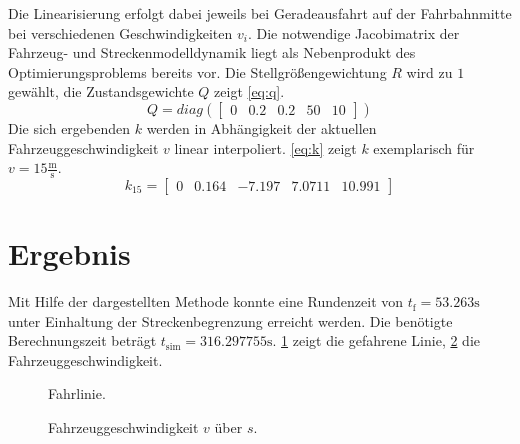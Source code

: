 \documentclass[pdf]{ifacconf}
\begin{document}
\begin{enumerate}
\begin{equation}
	\end{equation}		
	Die Linearisierung erfolgt dabei jeweils bei Geradeausfahrt auf der Fahrbahnmitte bei verschiedenen Geschwindigkeiten $v_i$. Die notwendige Jacobimatrix der Fahrzeug- und Streckenmodelldynamik liegt als Nebenprodukt des Optimierungsproblems bereits vor. Die Stellgrößengewichtung $R$ wird zu $1$ gewählt, die Zustandsgewichte $Q$ zeigt \ref{eq:q}.
	\begin{equation}
		Q = diag(\begin{bmatrix}
		0 & 0.2 & 0.2 & 50 & 10
		\end{bmatrix})
		\label{eq:q}
	\end{equation}	 
	Die sich ergebenden $k$ werden in Abhängigkeit der aktuellen Fahrzeuggeschwindigkeit $v$ linear interpoliert. \ref{eq:k} zeigt $k$ exemplarisch für $v = 15 \frac{\text{m}}{\text{s}}$.
	\begin{equation}
		k_{15} = \begin{bmatrix}
		0 & 0.164 & -7.197 & 7.0711 & 10.991	
		\end{bmatrix}
		\label{eq:k}
	\end{equation}	 
\end{enumerate}

\section{Ergebnis}
Mit Hilfe der dargestellten Methode konnte eine Rundenzeit von $t_{\text{f}}=53.263 \text{s}$ unter Einhaltung der Streckenbegrenzung erreicht werden. Die benötigte Berechnungszeit beträgt $t_{\text{sim}}=316.297755 \text{s}$. \ref{fig2} zeigt die gefahrene Linie, \ref{fig3} die Fahrzeuggeschwindigkeit. 
\begin{figure}[h]
	\begin{center}
		\scalebox{0.8}{} %
		\caption{Fahrlinie.}
		\label{fig2}
	\end{center}
\end{figure}

\begin{figure}[h]
	\begin{center}
		\scalebox{0.5}{} %
		\caption{Fahrzeuggeschwindigkeit $v$ über $s$.}
		\label{fig3}
	\end{center}
\end{figure}
\end{document}
